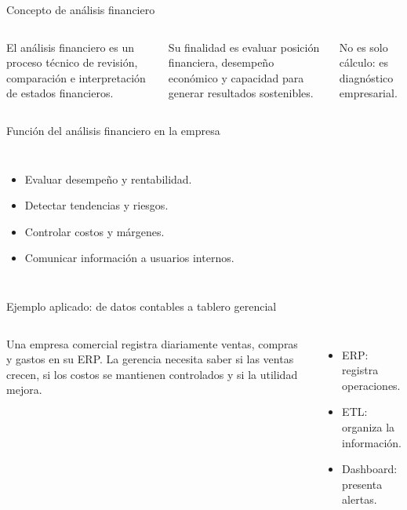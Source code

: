\begin{frame}{Concepto de análisis financiero}
  \begin{columns}[T,onlytextwidth]
    \footnotesize
    El análisis financiero es un proceso técnico de revisión, comparación e interpretación de estados financieros.

    \vspace{0.4em}
    Su finalidad es evaluar posición financiera, desempeño económico y capacidad para generar resultados sostenibles.

    \vspace{0.4em}
    No es solo cálculo: es diagnóstico empresarial.
  \end{columns}
\end{frame}

\begin{frame}{Función del análisis financiero en la empresa}
  \begin{columns}[T,onlytextwidth]
    \begin{itemize}
      \item Evaluar desempeño y rentabilidad.
      \item Detectar tendencias y riesgos.
      \item Controlar costos y márgenes.
      \item Comunicar información a usuarios internos.
    \end{itemize}
  \end{columns}
\end{frame}

\begin{frame}{Ejemplo aplicado: de datos contables a tablero gerencial}
  \begin{columns}[T,onlytextwidth]
    \footnotesize
    Una empresa comercial registra diariamente ventas, compras y gastos en su ERP. La gerencia necesita saber si las ventas crecen, si los costos se mantienen controlados y si la utilidad mejora.

    \vspace{0.35em}
    \begin{itemize}
      \item ERP: registra operaciones.
      \item ETL: organiza la información.
      \item Dashboard: presenta alertas.
    \end{itemize}
    \flujoERPdashboard
  \end{columns}
\end{frame}

